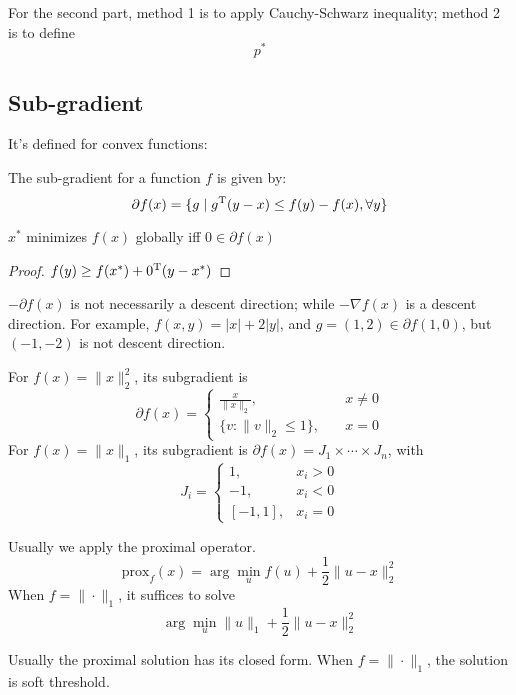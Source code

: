 For the second part, method 1 is to apply Cauchy-Schwarz inequality; method 2 is to define
\[
p^*
\]


\subsection{Sub-gradient}
It's defined for convex functions:
\begin{definition}
The sub-gradient for a function $f$ is given by:
\[
\partial f(x)=\{g\mid g^{\mathrm T} (y-x)\le f(y) - f(x),\forall y\}
\]
\end{definition}
\begin{proposition}
$x^*$ minimizes $f(x)$ globally iff $0\in\partial f(x)$
\end{proposition}
\begin{proof}
$
f(y)\ge f(x^*)+0^{\mathrm T}(y-x^*)
$
\end{proof}
\begin{remark}
$-\partial f(x)$ is not necessarily a descent direction; while $-\nabla f(x)$ is a descent direction. For example, $f(x,y)=|x|+2|y|$, and $g=(1,2)\in\partial f(1,0)$, but $(-1,-2)$ is not descent direction.
\end{remark}

\begin{example}
For $f(x) = \|x\|_2^2$, its subgradient is
\[
\partial f(x)=\left\{
\begin{aligned}
\frac{x}{\|x\|_2},&\quad x\ne0\\
\{v:\|v\|_2\le 1\},&\quad x=0
\end{aligned}
\right.
\]
For $f(x)=\|x\|_1$, its subgradient is $\partial f(x)=J_1\times\cdots\times J_n$, with
\[
J_i=\left\{
\begin{aligned}
1,&x_i>0\\
-1,&x_i<0\\
[-1,1],&x_i=0
\end{aligned}
\right.
\]
\end{example}

Usually we apply the proximal operator.
\[
\mbox{prox}_f(x)=\arg\min_{u}f(u)+\frac{1}{2}\|u-x\|^2_2
\]
When $f=\|\cdot\|_1$, it suffices to solve
\[
\arg\min_{u}\|u\|_1+\frac{1}{2}\|u-x\|_2^2
\]

Usually the proximal solution has its closed form. When $f=\|\cdot\|_1$, the solution is soft threshold.

